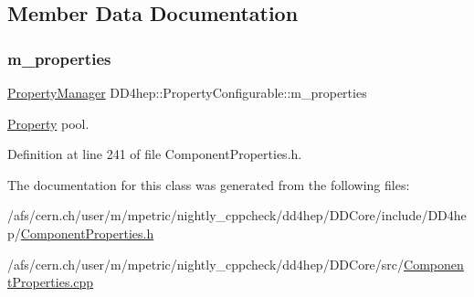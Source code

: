 \subsection{Member Data Documentation}
\hypertarget{class_d_d4hep_1_1_property_configurable_a5c68f50853fc154e348be09d10d3f0cf}{}\label{class_d_d4hep_1_1_property_configurable_a5c68f50853fc154e348be09d10d3f0cf} 
\subsubsection{\texorpdfstring{m\+\_\+properties}{m\_properties}}
{\footnotesize\ttfamily \hyperlink{class_d_d4hep_1_1_property_manager}{Property\+Manager} D\+D4hep\+::\+Property\+Configurable\+::m\+\_\+properties\hspace{0.3cm}{\ttfamily [protected]}}



\hyperlink{class_d_d4hep_1_1_property}{Property} pool. 



Definition at line 241 of file Component\+Properties.\+h.



The documentation for this class was generated from the following files\+:\begin{DoxyCompactItemize}
\item 
/afs/cern.\+ch/user/m/mpetric/nightly\+\_\+cppcheck/dd4hep/\+D\+D\+Core/include/\+D\+D4hep/\hyperlink{_component_properties_8h}{Component\+Properties.\+h}\item 
/afs/cern.\+ch/user/m/mpetric/nightly\+\_\+cppcheck/dd4hep/\+D\+D\+Core/src/\hyperlink{_component_properties_8cpp}{Component\+Properties.\+cpp}\end{DoxyCompactItemize}
